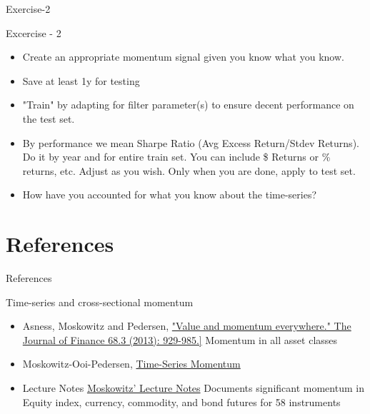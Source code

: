 \begin{frame}{Exercise-2}
\begin{alertblock}{Excercise - 2}
    \begin{itemize}
        \item Create an appropriate momentum signal given you know what you know.  
        \item Save at least 1y for testing
        \item "Train" by adapting for filter parameter(s) to ensure decent performance on the test set.
        \item By performance we mean Sharpe Ratio (Avg Excess Return/Stdev Returns). Do it by year and for entire train set. You can include \$ Returns or \% returns, etc. Adjust as you wish. Only when you are done, apply to test set.
        \item How have you accounted for what you know about the time-series?
        
    \end{itemize}
\end{alertblock}
\end{frame}


\section{References}
\begin{frame}{References}
\begin{alertblock}{Time-series and cross-sectional momentum}
    \begin{itemize}

 

    \item  Asness, Moskowitz and Pedersen, \href{https://pages.stern.nyu.edu/~lpederse/papers/ValMomEverywhere.pdf }{"Value and momentum everywhere." The Journal of Finance 68.3 (2013): 929-985.]} Momentum in all asset classes

  \item Moskowitz-Ooi-Pedersen, \href{http://papers.ssrn.com/sol3/papers.cfm?abstract_id=2089463}{ Time-Series Momentum}
   \item Lecture Notes \href{http://docs.lhpedersen.com/TSMOM_Slides.pdf}{Moskowitz' Lecture Notes}  Documents significant momentum in Equity index, currency, commodity, and bond futures for 58 instruments 
    \end{itemize}
\end{alertblock}
\end{frame}


